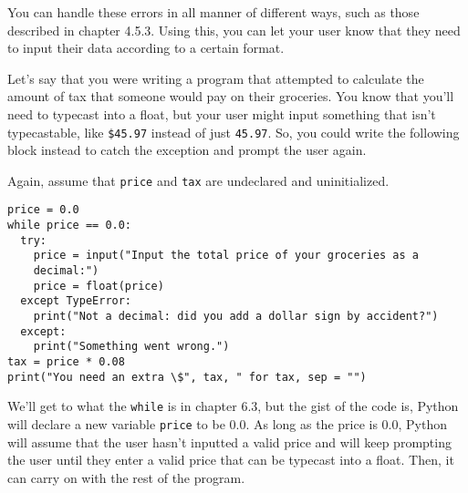 You can handle these errors in all manner of different ways, such as those described in chapter 4.5.3. Using this, you can let your user know that they need to input their data according to a certain format.\par
Let's say that you were writing a program that attempted to calculate the amount of tax that someone would pay on their groceries. You know that you'll need to typecast into a float, but your user might input something that isn't typecastable, like \verb|$45.97| instead of just \verb|45.97|. So, you could write the following block instead to catch the exception and prompt the user again.\par
Again, assume that \verb|price| and \verb|tax| are undeclared and uninitialized.\par
\begin{lstlisting}[style=pippython]
price = 0.0
while price == 0.0:
  try:
    price = input("Input the total price of your groceries as a 
    decimal:")
    price = float(price)
  except TypeError:
    print("Not a decimal: did you add a dollar sign by accident?")
  except:
    print("Something went wrong.")
tax = price * 0.08
print("You need an extra \$", tax, " for tax, sep = "")
\end{lstlisting}
We'll get to what the \verb|while| is in chapter 6.3, but the gist of the code is, Python will declare a new variable \verb|price| to be 0.0. As long as the price is 0.0, Python will assume that the user hasn't inputted a valid price and will keep prompting the user until they enter a valid price that can be typecast into a float. Then, it can carry on with the rest of the program.\par
